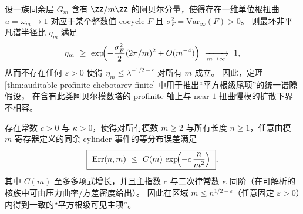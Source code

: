 \begin{corollary}\label{cor:abelian-tower-no-go}
设一族同余层 \(G_m\) 含有 \(\ZZ/m\ZZ\) 的阿贝尔分量，使得存在一维单位根扭曲 \(u=\omega_m\to 1\)
对应于某个整数值 cocycle \(F\) 且 \(\sigma_F^2=\mathrm{Var}_\infty(F)>0\)。
则最坏非平凡谱半径比 \(\eta_m\) 满足
\[
\eta_m\ \ge\ \exp\!\Bigl(-\frac{\sigma_F^2}{2}(2\pi/m)^2+O(m^{-4})\Bigr)\ \xrightarrow[m\to\infty]{}\ 1,
\]
从而不存在任何 \(\varepsilon>0\) 使得 \(\eta_m\le \lambda^{-1/2-\varepsilon}\) 对所有 \(m\) 成立。
因此，定理 \ref{thm:auditable-profinite-chebotarev-finite} 中用于推出“平方根级尾项”的统一谱隙假设，
在含有此类阿贝尔模数塔的 profinite 轴上与 near-\(1\) 扭曲慢模的扩散下界不相容。
\end{corollary}



\begin{conjecture}\label{conj:scaled-kernel-grh-diffusive}
存在常数 \(c>0\) 与 \(\kappa>0\)，使得对所有模数 \(m\ge 2\) 与所有长度 \(n\ge 1\)，任意由模 \(m\) 寄存器定义的同余 cylinder 事件的等分布误差满足
\[
\boxed{\ \mathrm{Err}(n,m)\ \le\ C(m)\,\exp\!\Bigl(-c\,\frac{n}{m^2}\Bigr)\ },
\]
其中 \(C(m)\) 至多多项式增长，并且主指数 \(c\) 与二次律常数 \(\kappa\) 同阶（在可解析的核族中可由压力曲率/方差密度给出）。
因此在区域 \(m\le n^{1/2-\varepsilon}\)（任意固定 \(\varepsilon>0\)）内得到一致的“平方根级可见主项”。
\end{conjecture}

